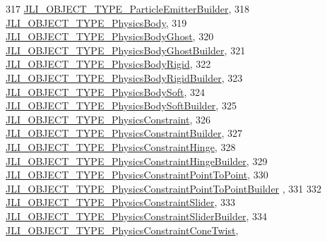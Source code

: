 \begin{DoxyCode}
317     \mbox{\hyperlink{namespacenjli_a6d56d4fbaf89fcf3e3d32839df05b444a9fda2cd33ae3e2e41f358cbb5358dfc6}{JLI\_OBJECT\_TYPE\_ParticleEmitterBuilder}},
318     \mbox{\hyperlink{namespacenjli_a6d56d4fbaf89fcf3e3d32839df05b444ae65052637b1299f88373298becce64bd}{JLI\_OBJECT\_TYPE\_PhysicsBody}},
319     \mbox{\hyperlink{namespacenjli_a6d56d4fbaf89fcf3e3d32839df05b444a7de12a8fc85326d6d9412989ea52c296}{JLI\_OBJECT\_TYPE\_PhysicsBodyGhost}},
320     \mbox{\hyperlink{namespacenjli_a6d56d4fbaf89fcf3e3d32839df05b444a611365dccd0786c1006e55e2f5046761}{JLI\_OBJECT\_TYPE\_PhysicsBodyGhostBuilder}},
321     \mbox{\hyperlink{namespacenjli_a6d56d4fbaf89fcf3e3d32839df05b444ab485691f93126ae256b6e88acc6268c7}{JLI\_OBJECT\_TYPE\_PhysicsBodyRigid}},
322     \mbox{\hyperlink{namespacenjli_a6d56d4fbaf89fcf3e3d32839df05b444a57c1c38bbc964e3244e5c47b395a236d}{JLI\_OBJECT\_TYPE\_PhysicsBodyRigidBuilder}},
323     \mbox{\hyperlink{namespacenjli_a6d56d4fbaf89fcf3e3d32839df05b444a31f3cdb937056c1927866bb5a6565908}{JLI\_OBJECT\_TYPE\_PhysicsBodySoft}},
324     \mbox{\hyperlink{namespacenjli_a6d56d4fbaf89fcf3e3d32839df05b444aa8f4b51caa8046885e018fd729a8b162}{JLI\_OBJECT\_TYPE\_PhysicsBodySoftBuilder}},
325     \mbox{\hyperlink{namespacenjli_a6d56d4fbaf89fcf3e3d32839df05b444a510ff85c220ba48c3f227ebd30a2078d}{JLI\_OBJECT\_TYPE\_PhysicsConstraint}},
326     \mbox{\hyperlink{namespacenjli_a6d56d4fbaf89fcf3e3d32839df05b444ad2fbdb1df3083f3c582567cece92f511}{JLI\_OBJECT\_TYPE\_PhysicsConstraintBuilder}},
327     \mbox{\hyperlink{namespacenjli_a6d56d4fbaf89fcf3e3d32839df05b444ac3c75cd492cc1fba614e2851c332220d}{JLI\_OBJECT\_TYPE\_PhysicsConstraintHinge}},
328     \mbox{\hyperlink{namespacenjli_a6d56d4fbaf89fcf3e3d32839df05b444a5f8cc7969ddb7de442685466342f3d39}{JLI\_OBJECT\_TYPE\_PhysicsConstraintHingeBuilder}},
329     \mbox{\hyperlink{namespacenjli_a6d56d4fbaf89fcf3e3d32839df05b444a0e67e880dd423e76642d36f2fd40f1d0}{JLI\_OBJECT\_TYPE\_PhysicsConstraintPointToPoint}},
330     \mbox{\hyperlink{namespacenjli_a6d56d4fbaf89fcf3e3d32839df05b444acb7dd3eef2f916bdb7ab153e4dc6ec56}{JLI\_OBJECT\_TYPE\_PhysicsConstraintPointToPointBuilder}}
      ,
331 
332     \mbox{\hyperlink{namespacenjli_a6d56d4fbaf89fcf3e3d32839df05b444a6a7c70e1372b79d9b3105fcfce52f033}{JLI\_OBJECT\_TYPE\_PhysicsConstraintSlider}},
333     \mbox{\hyperlink{namespacenjli_a6d56d4fbaf89fcf3e3d32839df05b444abc9ee150387b351148f450dea351512e}{JLI\_OBJECT\_TYPE\_PhysicsConstraintSliderBuilder}},
334     \mbox{\hyperlink{namespacenjli_a6d56d4fbaf89fcf3e3d32839df05b444a40e44c4e7b4d13076b643e569a63a350}{JLI\_OBJECT\_TYPE\_PhysicsConstraintConeTwist}},

\end{DoxyCode}
